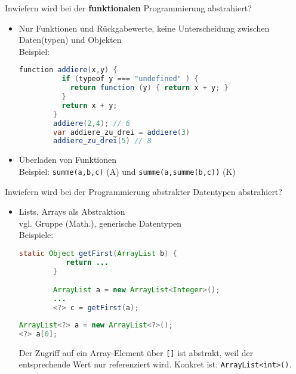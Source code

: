 \begin{card}
	Inwiefern wird bei der \textbf{funktionalen} Programmierung abstrahiert?
	\hr
	\begin{itemize}
	\item Nur Funktionen und Rückgabewerte, keine Unterscheidung zwischen Daten(typen) und  Objekten\\
		Beispiel:
		\begin{lstlisting}[language=Java]
		function addiere(x,y) {
		  if (typeof y === "undefined" ) {
		    return function (y) { return x + y; }
		  }
		  return x + y;
		}
		addiere(2,4); // 6
		var addiere_zu_drei = addiere(3)
		addiere_zu_drei(5) // 8
		\end{lstlisting}
	\item Überladen von Funktionen\\
		Beispiel: \texttt{summe(a,b,c)} (A) und \texttt{summe(a,summe(b,c))} (K)
	\end{itemize}
\end{card}

\begin{card}
	Inwiefern wird bei der Programmierung abstrakter Datentypen abstrahiert?
	\hr
	\begin{itemize}
	\item Lists, Arrays als Abstraktion\\
		vgl. Gruppe (Math.), generische Datentypen\\
		Beispiele:
		\begin{lstlisting}[language=Java]
		static Object getFirst(ArrayList b) {
		   return ...
		}

		ArrayList a = new ArrayList<Integer>();
		...
		<?> c = getFirst(a);
		\end{lstlisting}

		\begin{lstlisting}[language=Java]
ArrayList<?> a = new ArrayList<?>();
<?> a[0];

		\end{lstlisting}
    Der Zugriff auf ein Array-Element über \texttt{[]} ist abstrakt, weil der entsprechende Wert nur referenziert wird.
    Konkret ist: \texttt{ArrayList<int>()}.
	\end{itemize}
\end{card}

